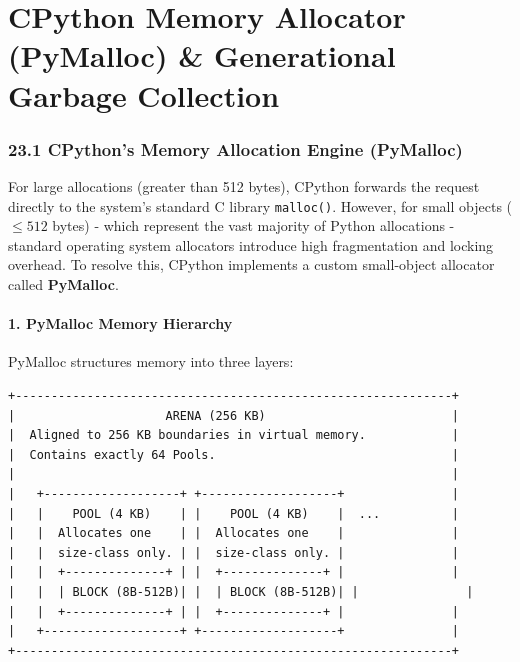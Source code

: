 \hypertarget{cpython-memory-allocator-pymalloc-generational-garbage-collection}{%
\chapter{CPython Memory Allocator (PyMalloc) \& Generational Garbage
Collection}\label{cpython-memory-allocator-pymalloc-generational-garbage-collection}}

\hypertarget{cpythons-memory-allocation-engine-pymalloc}{%
\subsection{23.1 CPython's Memory Allocation Engine
(PyMalloc)}\label{cpythons-memory-allocation-engine-pymalloc}}

For large allocations (greater than 512 bytes), CPython forwards the
request directly to the system's standard C library
\passthrough{\lstinline!malloc()!}. However, for small objects
(\(\le 512\) bytes) - which represent the vast majority of Python
allocations - standard operating system allocators introduce high
fragmentation and locking overhead. To resolve this, CPython implements
a custom small-object allocator called \textbf{PyMalloc}.

\hypertarget{pymalloc-memory-hierarchy}{%
\subsubsection{1. PyMalloc Memory
Hierarchy}\label{pymalloc-memory-hierarchy}}

PyMalloc structures memory into three layers:

\begin{lstlisting}
+-------------------------------------------------------------+
|                     ARENA (256 KB)                          |
|  Aligned to 256 KB boundaries in virtual memory.            |
|  Contains exactly 64 Pools.                                 |
|                                                             |
|   +-------------------+ +-------------------+               |
|   |    POOL (4 KB)    | |    POOL (4 KB)    |  ...          |
|   |  Allocates one    | |  Allocates one    |               |
|   |  size-class only. | |  size-class only. |               |
|   |  +--------------+ | |  +--------------+ |               |
|   |  | BLOCK (8B-512B)| |  | BLOCK (8B-512B)| |               |
|   |  +--------------+ | |  +--------------+ |               |
|   +-------------------+ +-------------------+               |
+-------------------------------------------------------------+
\end{lstlisting}

